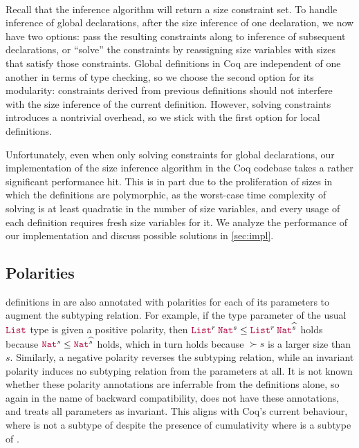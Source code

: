 \paragraph*{} Recall that the inference algorithm will return a size constraint set.
To handle inference of global declarations, after the size inference of one declaration,
we now have two options:
pass the resulting constraints along to inference of subsequent declarations,
or ``solve'' the constraints by reassigning size variables with sizes that satisfy those constraints.
Global definitions in Coq are independent of one another in terms of type checking,
so we choose the second option for its modularity:
constraints derived from previous definitions should not interfere with the size inference of the current definition.
However, solving constraints introduces a nontrivial overhead,
so we stick with the first option for local definitions.

Unfortunately, even when only solving constraints for global declarations,
our implementation of the size inference algorithm in the Coq codebase takes a rather significant performance hit.
This is in part due to the proliferation of sizes in which the definitions are polymorphic,
as the worst-case time complexity of solving is at least quadratic in the number of size variables,
and every usage of each definition requires fresh size variables for it.
We analyze the performance of our implementation and discuss possible solutions in \autoref{sec:impl}.

\subsection{Polarities}

\Coinductive definitions in \CIChatminus are also annotated with polarities for each of its parameters to augment the subtyping relation.
For example, if the type parameter of the usual $\List$ type is given a positive polarity,
then $\app{\List^r}{\Nat^s} \leq \app{\List^r}{\Nat^{\succ{s}}}$ holds
because $\Nat^s \leq \Nat^{\succ{s}}$ holds,
which in turn holds because $\succ{s}$ is a larger size than $s$.
Similarly, a negative polarity reverses the subtyping relation,
while an invariant polarity induces no subtyping relation from the parameters at all.
It is not known whether these polarity annotations are inferrable from the \coinductive definitions alone,
so again in the name of backward compatibility, \lang does not have these annotations,
and treats all parameters as invariant.
This aligns with Coq's current behaviour, where  is not a subtype of 
despite the presence of cumulativity where  is a subtype of .

